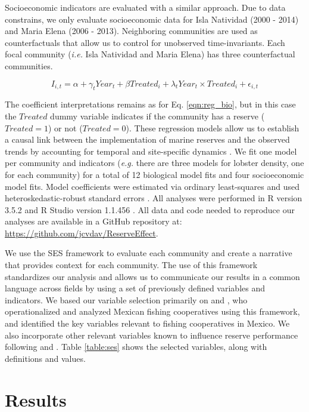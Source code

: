 \documentclass{frontiersSCNS}
\begin{document}
Socioeconomic indicators are evaluated with a similar approach. Due to
data constrains, we only evaluate socioeconomic data for Isla Natividad
(2000 - 2014) and Maria Elena (2006 - 2013). Neighboring communities are
used as counterfactuals that allow us to control for unobserved
time-invariants. Each focal community (\emph{i.e.} Isla Natividad and
Maria Elena) has three counterfactual communities.

\begin{equation}
I_{i,t} = \alpha + \gamma_{t} Year_t + \beta Treated_i + \lambda_{t} Year_t\times Treated_i +\epsilon_{i,t}
\label{eqn:soc_reg}
\end{equation}

The coefficient interpretations remains as for Eq. \ref{eqn:reg_bio},
but in this case the \(Treated\) dummy variable indicates if the
community has a reserve (\(Treated = 1\)) or not (\(Treated = 0\)).
These regression models allow us to establish a causal link between the
implementation of marine reserves and the observed trends by accounting
for temporal and site-specific dynamics \citep{depalma_2018}. We fit one
model per community and indicators (\emph{e.g.} there are three models
for lobster density, one for each community) for a total of 12
biological model fits and four socioeconomic model fits. Model
coefficients were estimated via ordinary least-squares and used
heteroskedastic-robust standard errors \citep{zeileis_2004-7n}. All
analyses were performed in R version 3.5.2 and R Studio version 1.1.456
\citep{R_2018}. All data and code needed to reproduce our analyses are
available in a GitHub repository at:
\url{https://github.com/jcvdav/ReserveEffect}.

We use the SES framework to evaluate each community and create a
narrative that provides context for each community. The use of this
framework standardizes our analysis and allows us to communicate our
results in a common language across fields by using a set of previously
defined variables and indicators. We based our variable selection
primarily on \citet{leslie_2015-na} and \citet{basurto_2013-oq}, who
operationalized and analyzed Mexican fishing cooperatives using this
framework, and identified the key variables relevant to fishing
cooperatives in Mexico. We also incorporate other relevant variables
known to influence reserve performance following
\citet{difranco_2016-Xw} and \citet{edgar_2014-UO}. Table
\ref{table:ses} shows the selected variables, along with definitions and
values.

\hypertarget{results}{%
\section{Results}\label{results}}
\end{document}
